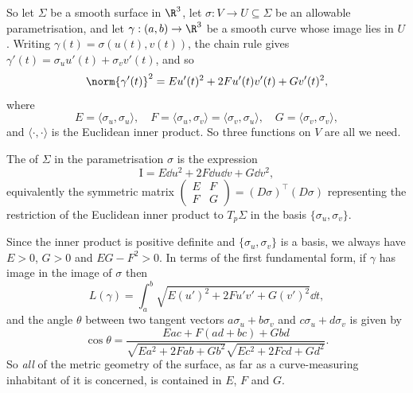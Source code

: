 So let $\Sigma$ be a smooth surface in $\R^3$, let $\sigma: V \rightarrow U \subseteq \Sigma$ be an allowable parametrisation, and let $\gamma: (a, b) \rightarrow \R^3$ be a smooth curve whose image lies in $U$. Writing $\gamma(t) = \sigma(u(t), v(t))$, the chain rule gives $\gamma'(t) = \sigma_u u'(t) + \sigma_v v'(t)$, and so
$$
\norm{\gamma'(t)}^2 = E u'(t)^2 + 2F u'(t) v'(t) + Gv'(t)^2,
$$
where
$$
E = \langle \sigma_u, \sigma_u\rangle, \quad F = \langle \sigma_u, \sigma_v \rangle = \langle \sigma_v, \sigma_u \rangle, \quad G = \langle \sigma_v, \sigma_v \rangle,
$$
and $\langle \cdot, \cdot \rangle$ is the Euclidean inner product. So three functions on $V$ are all we need.

\begin{definition}
    The  of $\Sigma$ in the parametrisation $\sigma$ is the expression
    $$
    \mathrm{I} = E \dd u^2 + 2F \dd u \dd v + G \dd v^2,
    $$
    equivalently the symmetric matrix $\begin{pmatrix} E & F \\ F & G\end{pmatrix} = (D\sigma)^\top (D\sigma)$ representing the restriction of the Euclidean inner product to $T_p\Sigma$ in the basis $\{\sigma_u, \sigma_v\}$.
\end{definition}

Since the inner product is positive definite and $\{\sigma_u, \sigma_v\}$ is a basis, we always have $E > 0$, $G > 0$ and $EG - F^2 > 0$. In terms of the first fundamental form, if $\gamma$ has image in the image of $\sigma$ then
$$
L(\gamma) = \int_a^b \sqrt{E (u')^2 + 2F u' v' + G(v')^2} \dd t,
$$
and the angle $\theta$ between two tangent vectors $a\sigma_u + b\sigma_v$ and $c\sigma_u + d\sigma_v$ is given by
$$
\cos\theta = \frac{Eac + F(ad+bc) + Gbd}{\sqrt{Ea^2 + 2Fab+Gb^2}\sqrt{Ec^2+2Fcd+Gd^2}}.
$$
So \emph{all} of the metric geometry of the surface, as far as a curve-measuring inhabitant of it is concerned, is contained in $E$, $F$ and $G$.

